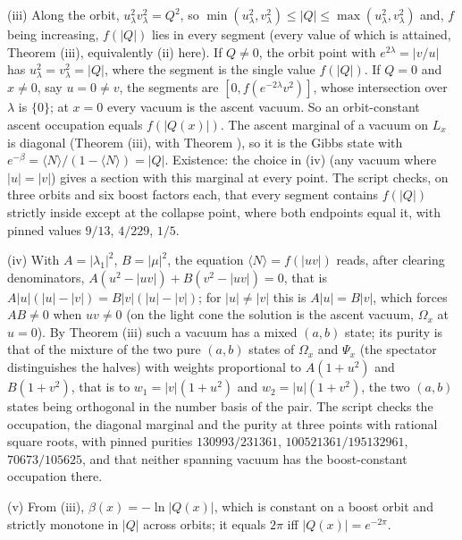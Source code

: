 (iii) Along the orbit, $u_{\lambda}^{2}v_{\lambda}^{2} = Q^{2}$, so $\min(u_{\lambda}^{2}, v_{\lambda}^{2}) \le |Q| \le \max(u_{\lambda}^{2}, v_{\lambda}^{2})$ and, $f$ being increasing, $f(|Q|)$ lies in every segment (every value of which is attained, Theorem (iii), equivalently (ii) here). If $Q \ne 0$, the orbit point with $e^{2\lambda} = |v/u|$ has $u_{\lambda}^{2} = v_{\lambda}^{2} = |Q|$, where the segment is the single value $f(|Q|)$. If $Q = 0$ and $x \ne 0$, say $u = 0 \ne v$, the segments are $[0, f(e^{-2\lambda}v^{2})]$, whose intersection over $\lambda$ is $\{0\}$; at $x = 0$ every vacuum is the ascent vacuum. So an orbit-constant ascent occupation equals $f(|Q(x)|)$. The ascent marginal of a vacuum on $L_{x}$ is diagonal (Theorem (iii), with Theorem ), so it is the Gibbs state with $e^{-\beta} = \langle N\rangle/(1 - \langle N\rangle) = |Q|$. Existence: the choice in (iv) (any vacuum where $|u| = |v|$) gives a section with this marginal at every point. The script checks, on three orbits and six boost factors each, that every segment contains $f(|Q|)$ strictly inside except at the collapse point, where both endpoints equal it, with pinned values $9/13$, $4/229$, $1/5$.

(iv) With $A = |\lambda_{1}|^{2}$, $B = |\mu|^{2}$, the equation $\langle N\rangle = f(|uv|)$ reads, after clearing denominators, $A(u^{2} - |uv|) + B(v^{2} - |uv|) = 0$, that is $A|u|(|u| - |v|) = B|v|(|u| - |v|)$; for $|u| \ne |v|$ this is $A|u| = B|v|$, which forces $AB \ne 0$ when $uv \ne 0$ (on the light cone the solution is the ascent vacuum, $\Omega_{x}$ at $u = 0$). By Theorem (iii) such a vacuum has a mixed $(a,b)$ state; its purity is that of the mixture of the two pure $(a,b)$ states of $\Omega_{x}$ and $\Psi_{x}$ (the spectator distinguishes the halves) with weights proportional to $A(1 + u^{2})$ and $B(1 + v^{2})$, that is to $w_{1} = |v|(1 + u^{2})$ and $w_{2} = |u|(1 + v^{2})$, the two $(a,b)$ states being orthogonal in the number basis of the pair. The script checks the occupation, the diagonal marginal and the purity at three points with rational square roots, with pinned purities $130993/231361$, $100521361/195132961$, $70673/105625$, and that neither spanning vacuum has the boost-constant occupation there.

(v) From (iii), $\beta(x) = -\ln|Q(x)|$, which is constant on a boost orbit and strictly monotone in $|Q|$ across orbits; it equals $2\pi$ iff $|Q(x)| = e^{-2\pi}$.

